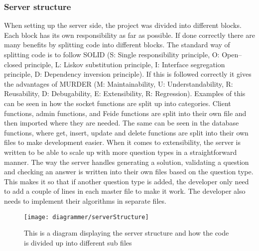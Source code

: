 \subsubsection{Server structure}
When setting up the server side, the project was divided into different blocks. Each block has its own responsibility as far as possible. If done correctly there are many benefits by splitting code into different blocks. The standard way of splitting code is to follow SOLID (S: Single responsibility principle, O: Open–closed principle, L: Liskov substitution principle, I: Interface segregation principle, D: Dependency inversion principle). If this is followed correctly it gives the advantages of MURDER (M: Maintainability, U: Understandability, R: Reusability, D: Debugability, E: Extensibility, R: Regression). Examples of this can be seen in how the socket functions are split up into categories. Client functions, admin functions, and Feide functions are split into their own file and then imported where they are needed. The same can be seen in the database functions, where get, insert, update and delete functions are split into their own files to make development easier. When it comes to extensibility, the server is written to be able to scale up with more question types in a straightforward manner. The way the server handles generating a solution, validating a question and checking an answer is written into their own files based on the question type. This makes it so that if another question type is added, the developer only need to add a couple of lines in each master file to make it work. The developer also needs to implement their algorithms in separate files.
\begin{figure}[H]
    \centering
    \texttt{[image: diagrammer/serverStructure]}
    \caption{This is a diagram displaying the server structure and how the code is divided up into different sub files}
    \label{fig:serverStructure}
\end{figure}